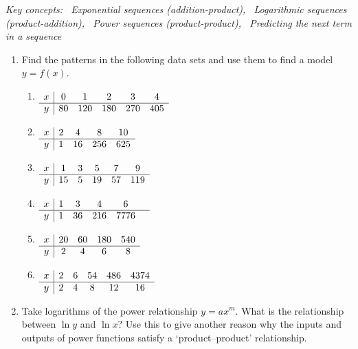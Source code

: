 \pagebreak[3]


\begin{exercises}{}{}
	\hangindent\leftmargini
	\emph{Key concepts: \ Exponential sequences (addition-product), \ Logarithmic sequences (product-addition), \ Power sequences (product-product), \ Predicting the next term in a sequence}
	
	\begin{enumerate}
	  \item Find the patterns in the following data sets and use them to find a model $y=f(x)$.
	  \begin{enumerate}
	    \item $\begin{array}[t]{c|ccccc}
				x&0&1&2&3&4\\\hline
				y&80&120&180&270&405
	  	\end{array}$
	  	\item	$\begin{array}[t]{c|cccc}
				x&2&4&8&10\\\hline
				y&1&16&256&625
			\end{array}$
			\item $\begin{array}[t]{c|ccccc}
				x&1&3&5&7&9\\\hline
				y&15&5&19&57&119
			\end{array}$
			\item	$\begin{array}[t]{c|ccccc}
				x&1&3&4&6\\\hline
				y&1&36&216&7776&
			\end{array}$
			\item	$\begin{array}[t]{c|ccccc}
				x&20&60&180&540\\\hline
				y&2&4&6&8
			\end{array}$
			\item	$\begin{array}[t]{c|ccccc}
				x&2&6&54&486&4374\\\hline
				y&2&4&8&12&16
			\end{array}$
		\end{enumerate}
		
	
		\item Take logarithms of the power relationship $y=ax^m$. What is the relationship between $\ln y$ and $\ln x$? Use this to give another reason why the inputs and outputs of power functions satisfy a `product--product' relationship.
		

\end{enumerate}
\end{exercises}
